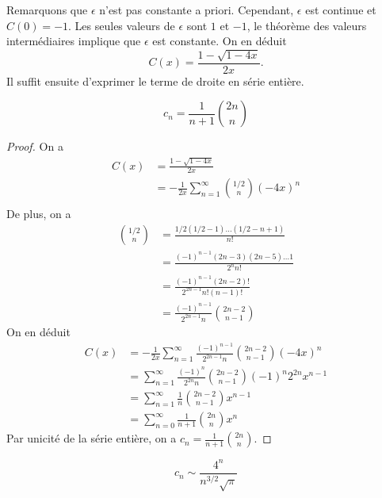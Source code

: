 \documentclass[../main.tex]{subfiles}
\begin{document}
Remarquons que \(\epsilon\) n'est pas constante a priori. Cependant, \(\epsilon\) est 
continue et \(C(0)=-1\). Les seules valeurs de \(\epsilon\) sont \(1\) et \(-1\), le 
théorème des valeurs intermédiaires implique que \(\epsilon\) est constante. On en déduit
\begin{equation}
    C(x) = \frac{1 - \sqrt{1-4x}}{2x}.
\end{equation}
Il suffit ensuite d'exprimer le terme de droite en série entière.
\begin{proposition}
    \begin{equation}
        c_n = \frac{1}{n+1}\binom{2n}{n}
    \end{equation}
\end{proposition}
\begin{proof}
    On a 
    \begin{align}
        C(x) & = \frac{1 - \sqrt{1-4x}}{2x}\\
        & = -\frac{1}{2x}\sum_{n=1}^\infty \binom{1/2}{n}(-4x)^n\\
    \end{align}
    De plus, on a 
    \begin{align}
        \binom{1/2}{n} &= \frac{1/2(1/2-1)\ldots(1/2-n+1)}{n!}\\
        & = \frac{(-1)^{n-1}(2n-3)(2n-5)\ldots 1}{2^n n!}\\
        & = \frac{(-1)^{n-1}(2n-2)!}{2^{2n-1} n! (n-1)!}\\
        & = \frac{(-1)^{n-1}}{2^{2n-1}n}\binom{2n-2}{n-1}
    \end{align}
    On en déduit 
    \begin{align}
        C(x) &= -\frac{1}{2x}\sum_{n=1}^\infty \frac{(-1)^{n-1}}{2^{2n-1}n}\binom{2n-2}{n-1}(-4x)^n\\
        & =\sum_{n=1}^\infty \frac{(-1)^{n}}{2^{2n}n}\binom{2n-2}{n-1}(-1)^n2^{2n}x^{n-1}\\
        & = \sum_{n=1}^\infty \frac{1}{n}\binom{2n-2}{n-1}x^{n-1}\\
        & = \sum_{n=0}^\infty \frac{1}{n+1}\binom{2n}{n}x^n
    \end{align}
    Par unicité de la série entière, on a \(c_n = \frac{1}{n+1}\binom{2n}{n}\).
\end{proof}
\begin{corollary}
    \begin{equation}
        c_n \sim \frac{4^n}{n^{3/2}\sqrt{\pi}}
    \end{equation}
\end{corollary}
\end{document}
